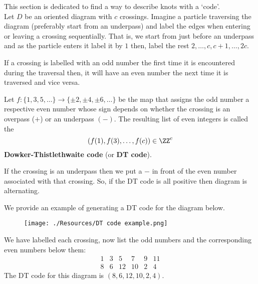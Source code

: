 \documentclass[12pt, a4paper]{article}
\begin{document}
This section is dedicated to find a way to describe knots with a `code'. \\

Let \(D\) be an oriented diagram with \(c\) crossings. Imagine a particle traversing the diagram (preferably start from an underpass) and label the edges when entering or leaving a crossing sequentially. That is, we start from just before an underpass and as the particle enters it label it by \(1\) then, label the rest \(2,\ldots,c,c+1,\ldots,2c\). 

\begin{mdlemma}
    If a crossing is labelled with an odd number the first time it is encountered during the traversal then, it will have an even number the next time it is traversed and vice versa.
\end{mdlemma}

\begin{definition}
    Let \(f : \{1,3,5,\ldots\} \to \{\pm 2, \pm 4, \pm 6,\ldots \}\) be the map that assigns the odd number a respective even number whose sign depends on whether the crossing is an overpass (\(+\)) or an underpass \((-)\).
    The resulting list of even integers is called the 
    \[(f(1),f(3),\ldots,f(c)) \in \ZZ^c\]
    \textbf{Dowker-Thistlethwaite code} (or \textbf{DT code}).
\end{definition}

\begin{mdnote}
    If the crossing is an underpass then we put a \(-\) in front of the even number associated with that crossing. So, if the DT code is all positive then diagram is alternating.
\end{mdnote}

\begin{example}
    We provide an example of generating a DT code for the diagram below.
    \begin{figure}[H]
         \begin{center}
             \texttt{[image: ./Resources/DT code example.png]}
         \end{center}
    \end{figure}
    We have labelled each crossing, now list the odd numbers and the corresponding even numbers below them:
    \[ \begin{array}{cccccc}
        1 & 3 & 5 &7  & 9 & 11 \\
        8 & 6 & 12 &10 &2 & 4
    \end{array}\] 
    The DT code for this diagram is \((8,6,12,10,2,4)\).
\end{example}
\end{document}
